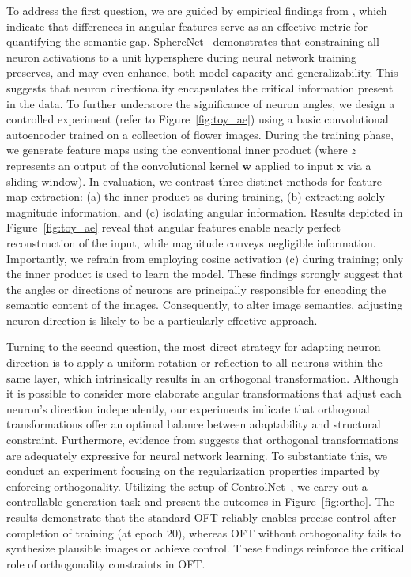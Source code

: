 To address the first question, we are guided by empirical findings from \cite{liu2018decoupled,chen2020angular}, which indicate that differences in angular features serve as an effective metric for quantifying the semantic gap. SphereNet~\cite{liu2017deep} demonstrates that constraining all neuron activations to a unit hypersphere during neural network training preserves, and may even enhance, both model capacity and generalizability. This suggests that neuron directionality encapsulates the critical information present in the data. To further underscore the significance of neuron angles, we design a controlled experiment (refer to Figure~\ref{fig:toy_ae}) using a basic convolutional autoencoder trained on a collection of flower images. During the training phase, we generate feature maps using the conventional inner product (where $z$ represents an output of the convolutional kernel $\bm{w}$ applied to input $\bm{x}$ via a sliding window). In evaluation, we contrast three distinct methods for feature map extraction: (a) the inner product as during training, (b) extracting solely magnitude information, and (c) isolating angular information. Results depicted in Figure~\ref{fig:toy_ae} reveal that angular features enable nearly perfect reconstruction of the input, while magnitude conveys negligible information. Importantly, we refrain from employing cosine activation (c) during training; only the inner product is used to learn the model. These findings strongly suggest that the angles or directions of neurons are principally responsible for encoding the semantic content of the images. Consequently, to alter image semantics, adjusting neuron direction is likely to be a particularly effective approach.

Turning to the second question, the most direct strategy for adapting neuron direction is to apply a uniform rotation or reflection to all neurons within the same layer, which intrinsically results in an orthogonal transformation. Although it is possible to consider more elaborate angular transformations that adjust each neuron's direction independently, our experiments indicate that orthogonal transformations offer an optimal balance between adaptability and structural constraint. Furthermore, evidence from \cite{liu2021orthogonal} suggests that orthogonal transformations are adequately expressive for neural network learning. To substantiate this, we conduct an experiment focusing on the regularization properties imparted by enforcing orthogonality. Utilizing the setup of ControlNet~\cite{zhang2023adding}, we carry out a controllable generation task and present the outcomes in Figure~\ref{fig:ortho}. The results demonstrate that the standard OFT reliably enables precise control after completion of training (at epoch 20), whereas OFT without orthogonality fails to synthesize plausible images or achieve control. These findings reinforce the critical role of orthogonality constraints in OFT.

